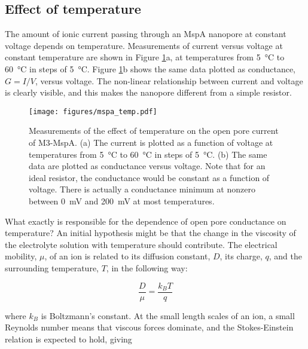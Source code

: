 \subsection{Effect of temperature}

The amount of ionic current passing through an MspA nanopore at constant voltage depends on temperature.  Measurements of current versus voltage at constant temperature are shown in Figure \ref{fig:mspa_current_temp}a, at temperatures from \SI{5}{\degreeCelsius} to \SI{60}{\degreeCelsius} in steps of \SI{5}{\degreeCelsius}.  Figure \ref{fig:mspa_current_temp}b shows the same data plotted as conductance, $G=I/V$, versus voltage.  The non-linear relationship between current and voltage is clearly visible, and this makes the nanopore different from a simple resistor.

\begin{figure}[h]
\begin{centering}
\texttt{[image: figures/mspa\_temp.pdf]}
\caption[MspA current versus temperature]{Measurements of the effect of temperature on the open pore current of M3-MspA.  (a) The current is plotted as a function of voltage at temperatures from \SI{5}{\degreeCelsius} to \SI{60}{\degreeCelsius} in steps of \SI{5}{\degreeCelsius}.  (b) The same data are plotted as conductance versus voltage.  Note that for an ideal resistor, the conductance would be constant as a function of voltage.  There is actually a conductance minimum at nonzero between \SI{0}{\mV} and \SI{200}{\mV} at most temperatures.}
\label{fig:mspa_current_temp}
\end{centering}
\end{figure}

What exactly is responsible for the dependence of open pore conductance on temperature?  An initial hypothesis might be that the change in the viscosity of the electrolyte solution with temperature should contribute.  The electrical mobility, $\mu$, of an ion is related to its diffusion constant, $D$, its charge, $q$, and the surrounding temperature, $T$, in the following way:

\begin{equation}
\frac{D}{\mu} = \frac{k_B T}{q}
\label{eqn:einstein_mobility}
\end{equation}

\noindent
where $k_B$ is Boltzmann's constant.  At the small length scales of an ion, a small Reynolds number means that viscous forces dominate, and the Stokes-Einstein relation is expected to hold, giving

